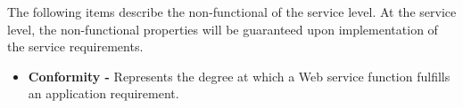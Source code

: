 


The following items describe the non-functional  of the
service level. At the service level, the non-functional properties will be guaranteed upon
implementation of the service requirements.
  
\begin{itemize} 

  \item \textbf{Conformity -} Represents the degree at which a Web service
  function fulfills an application requirement.  
  

\end{itemize}
